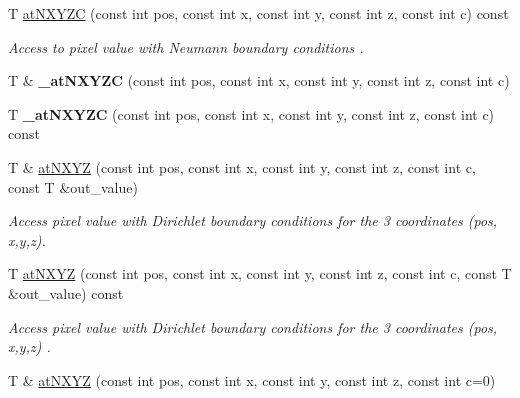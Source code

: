 \begin{DoxyCompactItemize}
T \hyperlink{structcimg__library__suffixed_1_1CImgList_ab60a4caba174a05983a8f8790cb3c5cd}{at\+N\+X\+Y\+ZC} (const int pos, const int x, const int y, const int z, const int c) const
\begin{DoxyCompactList}\small\item\em Access to pixel value with Neumann boundary conditions . \end{DoxyCompactList}\item 
\mbox{\label{structcimg__library__suffixed_1_1CImgList_a6460f15169915e51268e62d8c2fd4c28}} 
T \& {\bfseries \+\_\+at\+N\+X\+Y\+ZC} (const int pos, const int x, const int y, const int z, const int c)
\item 
\mbox{\label{structcimg__library__suffixed_1_1CImgList_a4df9d729c5dbce3309adca8b1d8299f0}} 
T {\bfseries \+\_\+at\+N\+X\+Y\+ZC} (const int pos, const int x, const int y, const int z, const int c) const
\item 
T \& \hyperlink{structcimg__library__suffixed_1_1CImgList_a2fa5711e480b6120cb5dfa27b718a08b}{at\+N\+X\+YZ} (const int pos, const int x, const int y, const int z, const int c, const T \&out\+\_\+value)
\begin{DoxyCompactList}\small\item\em Access pixel value with Dirichlet boundary conditions for the 3 coordinates ({\ttfamily pos}, {\ttfamily x},{\ttfamily y},{\ttfamily z}). \end{DoxyCompactList}\item 
\mbox{\label{structcimg__library__suffixed_1_1CImgList_a712c54070179c7fca098c7299552c29c}} 
T \hyperlink{structcimg__library__suffixed_1_1CImgList_a712c54070179c7fca098c7299552c29c}{at\+N\+X\+YZ} (const int pos, const int x, const int y, const int z, const int c, const T \&out\+\_\+value) const
\begin{DoxyCompactList}\small\item\em Access pixel value with Dirichlet boundary conditions for the 3 coordinates ({\ttfamily pos}, {\ttfamily x},{\ttfamily y},{\ttfamily z}) . \end{DoxyCompactList}\item 
T \& \hyperlink{structcimg__library__suffixed_1_1CImgList_aaa40ee9ddd9bf1a308aaf2c8d3330d7d}{at\+N\+X\+YZ} (const int pos, const int x, const int y, const int z, const int c=0)

\end{DoxyCompactItemize}
